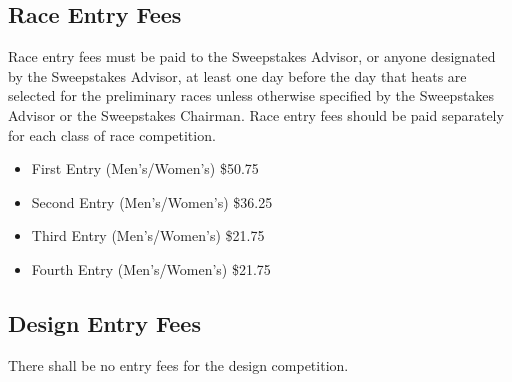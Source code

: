 \subsection{Race Entry Fees}

	Race entry fees must be paid to the Sweepstakes Advisor, or anyone designated by the Sweepstakes Advisor, at least one day before the day that heats are selected for the preliminary races unless otherwise specified by the Sweepstakes Advisor or the Sweepstakes Chairman. Race entry fees should be paid separately for each class of race competition.

	\begin{itemize}
		\item First Entry (Men's/Women's) \$50.75
		\item Second Entry (Men's/Women's) \$36.25
		\item Third Entry (Men's/Women's) \$21.75
		\item Fourth Entry (Men's/Women's) \$21.75
	\end{itemize}

\subsection{Design Entry Fees}

	There shall be no entry fees for the design competition.


